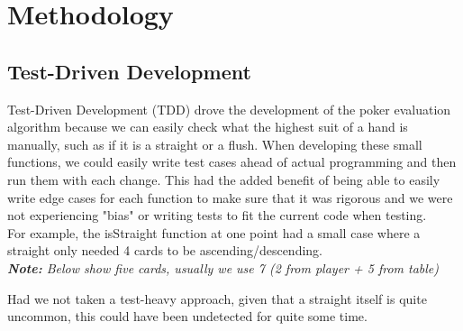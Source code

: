 \documentclass[11pt]{article}
\begin{document}
\newpage
\section{Methodology}

\subsection{Test-Driven Development}

Test-Driven Development (TDD) drove the development of the poker evaluation algorithm because we can easily check what the highest suit of a hand is manually, such as if it is a straight or a flush. When developing these small functions, we could easily write test cases ahead of actual programming and then run them with each change. This had the added benefit of being able to easily write edge cases for each function to make sure that it was rigorous and we were not experiencing "bias" or writing tests to fit the current code when testing.  \\

For example, the isStraight function at one point had a small case where a straight only needed 4 cards to be ascending/descending. \\




\textit{\textbf{Note:} Below show five cards, usually we use 7 (2 from player + 5 from table)} \\
\setlength{\fboxrule}{0pt}
\noindent{}%
\hfill%

Had we not taken a test-heavy approach, given that a straight itself is quite uncommon, this could have been undetected for quite some time. \\
\end{document}
